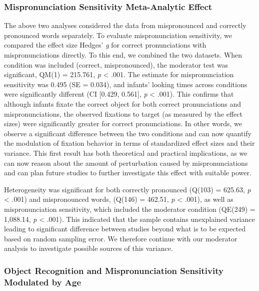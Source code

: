 \documentclass[man]{apa6}
\theoremstyle{definition}
\theoremstyle{definition}
\theoremstyle{definition}
\theoremstyle{remark}
\begin{document}
\subsubsection{Mispronunciation Sensitivity Meta-Analytic
Effect}\label{mispronunciation-sensitivity-meta-analytic-effect}

The above two analyses considered the data from mispronounced and
correctly pronounced words separately. To evaluate mispronunciation
sensitivity, we compared the effect size Hedges' \emph{g} for correct
pronunciations with mispronunciations directly. To this end, we combined
the two datasets. When condition was included (correct, mispronounced),
the moderator test was significant, QM(1) = 215.761, \emph{p}
\textless{} .001. The estimate for mispronunciation sensitivity was
0.495 (SE = 0.034), and infants' looking times across conditions were
significantly different (CI {[}0.429, 0.561{]}, \emph{p} \textless{}
.001). This confirms that although infants fixate the correct object for
both correct pronunciations and mispronunciations, the observed
fixations to target (as measured by the effect sizes) were significantly
greater for correct pronunciations. In other words, we observe a
significant difference between the two conditions and can now quantify
the modulation of fixation behavior in terms of standardized effect
sizes and their variance. This first result has both theoretical and
practical implications, as we can now reason about the amount of
perturbation caused by mispronunciations and can plan future studies to
further investigate this effect with suitable power.

Heterogeneity was significant for both correctly pronounced (Q(103) =
625.63, \emph{p} \textless{} .001) and mispronounced words, (Q(146) =
462.51, \emph{p} \textless{} .001), as well as mispronunciation
sensitivity, which included the moderator condition (QE(249) = 1,088.14,
\emph{p} \textless{} .001). This indicated that the sample contains
unexplained variance leading to significant difference between studies
beyond what is to be expected based on random sampling error. We
therefore continue with our moderator analysis to investigate possible
sources of this variance.

\subsubsection{Object Recognition and Mispronunciation Sensitivity
Modulated by
Age}\label{object-recognition-and-mispronunciation-sensitivity-modulated-by-age}
\end{document}
